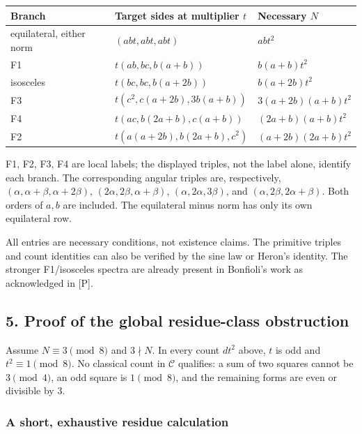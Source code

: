 \documentclass[
  11pt,
]{article}
\begin{document}
\begin{longtable}[]{@{}lll@{}}
\toprule\noalign{}
Branch & Target sides at multiplier \(t\) & Necessary \(N\) \\
\midrule\noalign{}
\endhead
\bottomrule\noalign{}
\endlastfoot
equilateral, either norm & \((abt,abt,abt)\) & \(abt^2\) \\
F1 & \(t(ab,bc,b(a+b))\) & \(b(a+b)t^2\) \\
isosceles & \(t(bc,bc,b(a+2b))\) & \(b(a+2b)t^2\) \\
F3 & \(t(c^2,c(a+2b),3b(a+b))\) & \(3(a+2b)(a+b)t^2\) \\
F4 & \(t(ac,b(2a+b),c(a+b))\) & \((2a+b)(a+b)t^2\) \\
F2 & \(t(a(a+2b),b(2a+b),c^2)\) & \((a+2b)(2a+b)t^2\) \\
\end{longtable}

F1, F2, F3, F4 are local labels; the displayed triples, not the label
alone, identify each branch. The corresponding angular triples are,
respectively, \((\alpha,\alpha+\beta,\alpha+2\beta)\),
\((2\alpha,2\beta,\alpha+\beta)\), \((\alpha,2\alpha,3\beta)\), and
\((\alpha,2\beta,2\alpha+\beta)\). Both orders of \(a,b\) are included.
The equilateral minus norm has only its own equilateral row.

All entries are necessary conditions, not existence claims. The
primitive triples and count identities can also be verified by the sine
law or Heron's identity. The stronger F1/isosceles spectra are already
present in Bonfioli's work as acknowledged in {[}P{]}.

\subsection{5. Proof of the global residue-class
obstruction}\label{proof-of-the-global-residue-class-obstruction}

Assume \(N\equiv3\pmod8\) and \(3\nmid N\). In every count \(dt^2\)
above, \(t\) is odd and \(t^2\equiv1\pmod8\). No classical count in
\(\mathcal C\) qualifies: a sum of two squares cannot be \(3\pmod4\), an
odd square is \(1\pmod8\), and the remaining forms are even or divisible
by \(3\).

\subsubsection{A short, exhaustive residue
calculation}\label{a-short-exhaustive-residue-calculation}
\end{document}

